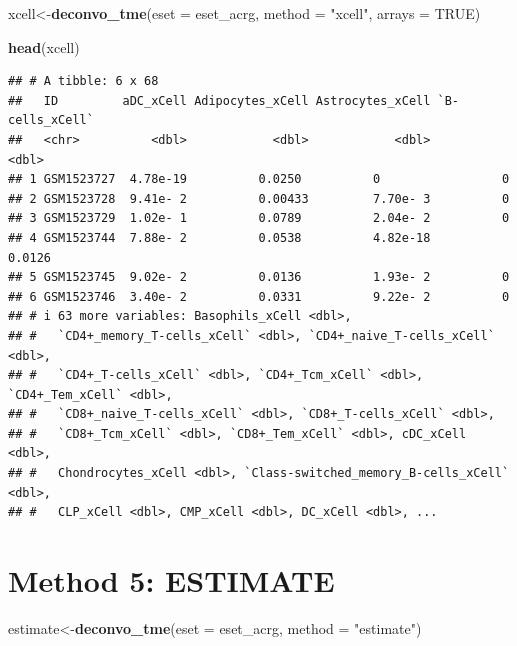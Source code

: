 \documentclass[
  12pt,
]{book}
\newenvironment{Shaded}{\begin{snugshade}}{\end{snugshade}}
\newcommand{\AttributeTok}[1]{\textcolor[rgb]{0.13,0.29,0.53}{#1}}
\newcommand{\ConstantTok}[1]{\textcolor[rgb]{0.56,0.35,0.01}{#1}}
\newcommand{\FunctionTok}[1]{\textcolor[rgb]{0.13,0.29,0.53}{\textbf{#1}}}
\newcommand{\NormalTok}[1]{#1}
\newcommand{\OtherTok}[1]{\textcolor[rgb]{0.56,0.35,0.01}{#1}}
\newcommand{\StringTok}[1]{\textcolor[rgb]{0.31,0.60,0.02}{#1}}
\theoremstyle{definition}
\theoremstyle{definition}
\theoremstyle{definition}
\theoremstyle{definition}
\theoremstyle{remark}
\begin{document}
\begin{Shaded}
\begin{Highlighting}[]
\NormalTok{xcell}\OtherTok{\textless{}{-}}\FunctionTok{deconvo\_tme}\NormalTok{(}\AttributeTok{eset =}\NormalTok{ eset\_acrg, }\AttributeTok{method =} \StringTok{"xcell"}\NormalTok{, }\AttributeTok{arrays =} \ConstantTok{TRUE}\NormalTok{)}
\end{Highlighting}
\end{Shaded}

\begin{Shaded}
\begin{Highlighting}[]
\FunctionTok{head}\NormalTok{(xcell)}
\end{Highlighting}
\end{Shaded}

\begin{verbatim}
## # A tibble: 6 x 68
##   ID         aDC_xCell Adipocytes_xCell Astrocytes_xCell `B-cells_xCell`
##   <chr>          <dbl>            <dbl>            <dbl>           <dbl>
## 1 GSM1523727  4.78e-19          0.0250          0                 0     
## 2 GSM1523728  9.41e- 2          0.00433         7.70e- 3          0     
## 3 GSM1523729  1.02e- 1          0.0789          2.04e- 2          0     
## 4 GSM1523744  7.88e- 2          0.0538          4.82e-18          0.0126
## 5 GSM1523745  9.02e- 2          0.0136          1.93e- 2          0     
## 6 GSM1523746  3.40e- 2          0.0331          9.22e- 2          0     
## # i 63 more variables: Basophils_xCell <dbl>,
## #   `CD4+_memory_T-cells_xCell` <dbl>, `CD4+_naive_T-cells_xCell` <dbl>,
## #   `CD4+_T-cells_xCell` <dbl>, `CD4+_Tcm_xCell` <dbl>, `CD4+_Tem_xCell` <dbl>,
## #   `CD8+_naive_T-cells_xCell` <dbl>, `CD8+_T-cells_xCell` <dbl>,
## #   `CD8+_Tcm_xCell` <dbl>, `CD8+_Tem_xCell` <dbl>, cDC_xCell <dbl>,
## #   Chondrocytes_xCell <dbl>, `Class-switched_memory_B-cells_xCell` <dbl>,
## #   CLP_xCell <dbl>, CMP_xCell <dbl>, DC_xCell <dbl>, ...
\end{verbatim}

\hypertarget{method-5-estimate}{%
\section{Method 5: ESTIMATE}\label{method-5-estimate}}

\begin{Shaded}
\begin{Highlighting}[]
\NormalTok{estimate}\OtherTok{\textless{}{-}}\FunctionTok{deconvo\_tme}\NormalTok{(}\AttributeTok{eset =}\NormalTok{ eset\_acrg, }\AttributeTok{method =} \StringTok{"estimate"}\NormalTok{)}
\end{Highlighting}
\end{Shaded}
\end{document}
